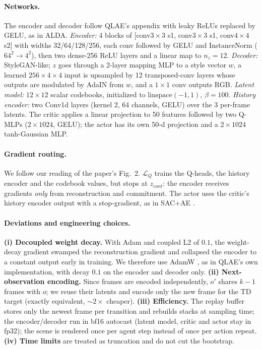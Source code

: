 \documentclass{article}
\theoremstyle{plain}
\theoremstyle{definition}
\theoremstyle{remark}
\begin{document}
\paragraph{Networks.} The encoder and decoder follow QLAE's appendix with
leaky ReLUs replaced by GELU, as in ALDA. \emph{Encoder:} 4 blocks of
[conv$3{\times}3$ s1, conv$3{\times}3$ s1, conv$4{\times}4$ s2] with widths
32/64/128/256, each conv followed by GELU and InstanceNorm ($64^2\!\to\!4^2$), then
two dense-256 ReLU layers and a linear map to $n_z{=}12$. \emph{Decoder:}
StyleGAN-like; $z$ goes through a 2-layer mapping MLP to a style vector $w$, a
learned $256{\times}4{\times}4$ input is upsampled by 12 transposed-conv layers
whose outputs are modulated by AdaIN from $w$, and a $1{\times}1$ conv outputs
RGB. \emph{Latent model:} $12{\times}12$ scalar codebooks, initialized to
$\mathrm{linspace}(-1,1)$, $\beta{=}100$. \emph{History encoder:} two Conv1d
layers (kernel 2, 64 channels, GELU) over the 3 per-frame latents. The critic
applies a linear projection to 50 features followed by two Q-MLPs
($2{\times}1024$, GELU); the actor has its own 50-d projection and a
$2{\times}1024$ tanh-Gaussian MLP.

\paragraph{Gradient routing.} We follow our reading of the paper's Fig.~2.
$\mathcal{L}_Q$ trains the Q-heads, the history encoder and the codebook
values, but stops at $z_{cont}$: the encoder receives gradients \emph{only}
from reconstruction and commitment. The actor uses the critic's history
encoder output with a stop-gradient, as in SAC+AE \citep{yarats2021sacae}.

\paragraph{Deviations and engineering choices.}
\textbf{(i) Decoupled weight decay.} With Adam and coupled L2 of $0.1$, the
weight-decay gradient swamped the reconstruction gradient and collapsed the
encoder to a constant output early in training. We therefore use AdamW
\citep{loshchilov2019adamw}, as in QLAE's own implementation, with decay
$0.1$ on the encoder and decoder only.
\textbf{(ii) Next-observation encoding.} Since frames are encoded
independently, $o'$ shares $k{-}1$ frames with $o$; we reuse their latents
and encode only the new frame for the TD target (exactly equivalent, ${\sim}2\times$
cheaper).
\textbf{(iii) Efficiency.} The replay buffer stores only the newest frame per
transition and rebuilds stacks at sampling time; the encoder/decoder run in
bf16 autocast (latent model, critic and actor stay in fp32); the scene is
rendered once per agent step instead of once per action repeat.
\textbf{(iv) Time limits} are treated as truncation and do not cut the
bootstrap.
\end{document}
